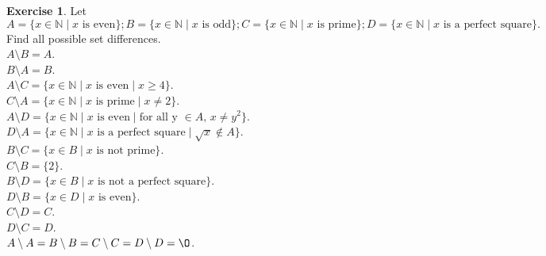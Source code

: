 \documentclass[11pt]{article}
\newcommand{\bbN}{\mathbb{N}}
\renewcommand{\emptyset}{\O}
\theoremstyle{definition}
\newtheorem{exercise}[theorem]{Exercise}
\numberwithin{equation}{subsection}
\begin{document}
\begin{exercise} 
Let $A=\{x\in\bbN\mid x\text{ is even}\}; B=\{x\in\bbN\mid x\text{ is odd}\}; C=\{x\in\bbN\mid x\text{ is prime}\}; D=\{x\in\bbN\mid x\text{ is a perfect square}\}.$
Find all possible set differences.
\\$A \setminus B = A$.
\\$B \setminus A = B$.
\\$A \setminus C = \{x\in\bbN\mid x\text{ is even} \mid x\geq 4\}$.
\\$C \setminus A = \{x\in\bbN\mid x\text{ is prime} \mid x \neq 2\}$.
\\$A \setminus D = \{x\in\bbN\mid x\text{ is even} \mid \text{for all y $\in A$, }x \neq y^2\}$.
\\$D \setminus A = \{x\in\bbN\mid x\text{ is a perfect square} \mid \text{$\sqrt{x}\notin A$}\}$.
\\$B \setminus C = \{x\in B \mid x\text{ is not prime\}}$.
\\$C \setminus B =\{2\} $.
\\$B \setminus D = \{x\in B \mid x\text{ is not a perfect square\}}$.
\\$D \setminus B = \{x\in D \mid x\text{ is even\}}$.
\\$C \setminus D = C$.
\\$D \setminus C = D$.
\\$A \setminus A = B \setminus B = C \setminus C = D \setminus D = \emptyset$.

\end{exercise} 
\end{document}
